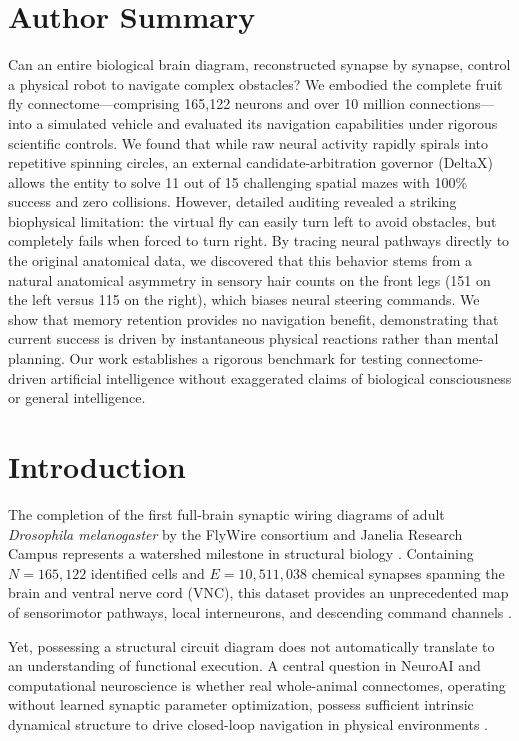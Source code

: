 \documentclass[10pt,letterpaper]{article}
\begin{document}
\section*{Author Summary}
Can an entire biological brain diagram, reconstructed synapse by synapse, control a physical robot to navigate complex obstacles? We embodied the complete fruit fly connectome---comprising 165,122 neurons and over 10 million connections---into a simulated vehicle and evaluated its navigation capabilities under rigorous scientific controls. We found that while raw neural activity rapidly spirals into repetitive spinning circles, an external candidate-arbitration governor (DeltaX) allows the entity to solve 11 out of 15 challenging spatial mazes with 100\% success and zero collisions. However, detailed auditing revealed a striking biophysical limitation: the virtual fly can easily turn left to avoid obstacles, but completely fails when forced to turn right. By tracing neural pathways directly to the original anatomical data, we discovered that this behavior stems from a natural anatomical asymmetry in sensory hair counts on the front legs (151 on the left versus 115 on the right), which biases neural steering commands. We show that memory retention provides no navigation benefit, demonstrating that current success is driven by instantaneous physical reactions rather than mental planning. Our work establishes a rigorous benchmark for testing connectome-driven artificial intelligence without exaggerated claims of biological consciousness or general intelligence.

\linenumbers

\section{Introduction}

The completion of the first full-brain synaptic wiring diagrams of adult \textit{Drosophila melanogaster} by the FlyWire consortium and Janelia Research Campus represents a watershed milestone in structural biology \cite{dorkenwald2024neuronal, schlegel2024whole, scheffer2020connectome}. Containing $N = 165,122$ identified cells and $E = 10,511,038$ chemical synapses spanning the brain and ventral nerve cord (VNC), this dataset provides an unprecedented map of sensorimotor pathways, local interneurons, and descending command channels \cite{rayshubskiy2020neural, bidaye2020two}. 

Yet, possessing a structural circuit diagram does not automatically translate to an understanding of functional execution. A central question in NeuroAI and computational neuroscience is whether real whole-animal connectomes, operating without learned synaptic parameter optimization, possess sufficient intrinsic dynamical structure to drive closed-loop navigation in physical environments \cite{pugliese2025whole}. 
\end{document}
